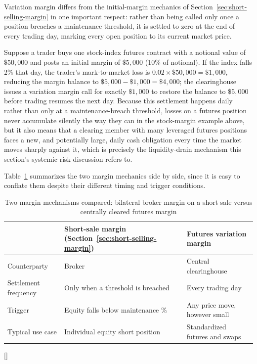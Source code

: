 \documentclass[../ai_in_finance]{subfiles}
\begin{document}
Variation margin differs from the initial-margin mechanics of Section~\ref{sec:short-selling-margin} in one important respect: rather than being called only once a position breaches a maintenance threshold, it is settled to zero at the end of every trading day, marking every open position to its current market price.

Suppose a trader buys one stock-index futures contract with a notional value of $\$50{,}000$ and posts an initial margin of $\$5{,}000$ ($10\%$ of notional). If the index falls $2\%$ that day, the trader's mark-to-market loss is $0.02 \times \$50{,}000 = \$1{,}000$, reducing the margin balance to $\$5{,}000 - \$1{,}000 = \$4{,}000$; the clearinghouse issues a variation margin call for exactly $\$1{,}000$ to restore the balance to $\$5{,}000$ before trading resumes the next day. Because this settlement happens daily rather than only at a maintenance-breach threshold, losses on a futures position never accumulate silently the way they can in the stock-margin example above, but it also means that a clearing member with many leveraged futures positions faces a new, and potentially large, daily cash obligation every time the market moves sharply against it, which is precisely the liquidity-drain mechanism this section's systemic-risk discussion refers to.

Table~\ref{tab:margin_comparison} summarizes the two margin mechanics side by side, since it is easy to conflate them despite their different timing and trigger conditions.

\begin{table}[htbp]
\centering
\begin{lrbox}{\bookmeasuredbox}
\begin{tabular}{lll}
\toprule
& Short-sale margin (Section~\ref{sec:short-selling-margin}) & Futures variation margin \\
\midrule
Counterparty & Broker & Central clearinghouse \\
Settlement frequency & Only when a threshold is breached & Every trading day \\
Trigger & Equity falls below maintenance \% & Any price move, however small \\
Typical use case & Individual equity short position & Standardized futures and swaps \\
\bottomrule
\end{tabular}
\end{lrbox}
\ifdim\wd\bookmeasuredbox<0.65\linewidth
\setlength{\bookcapwidth}{0.65\linewidth}
\else
\setlength{\bookcapwidth}{\wd\bookmeasuredbox}
\fi
{}[\bookcapwidth]{
\usebox{\bookmeasuredbox}
}{
\caption{Two margin mechanisms compared: bilateral broker margin on a short sale versus centrally cleared futures margin}
\label{tab:margin_comparison}
}
\end{table}
\end{document}
